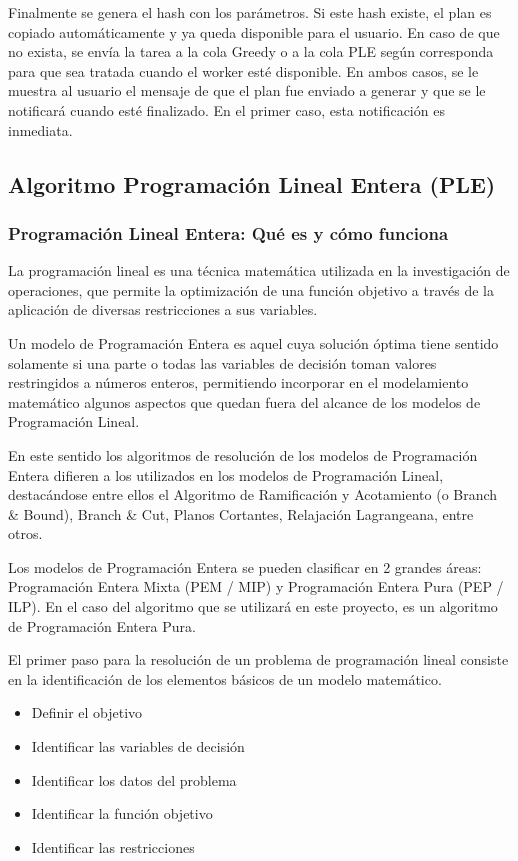 \documentclass[a4paper]{article}
\begin{document}
Finalmente se genera el hash con los parámetros. Si este hash existe, el plan es copiado automáticamente y ya queda disponible para el usuario. En caso de que no exista, se envía la tarea a la cola Greedy o a la cola PLE según corresponda para que sea tratada cuando el worker esté disponible. En ambos casos, se le muestra al usuario el mensaje de que el plan fue enviado a generar y que se le notificará cuando esté finalizado. En el primer caso, esta notificación es inmediata.


\subsection{Algoritmo Programación Lineal Entera (PLE)}

\subsubsection{Programación Lineal Entera: Qué es y cómo funciona}

La programación lineal es una técnica matemática utilizada en la investigación de operaciones, que permite la optimización de una función objetivo a través de la aplicación de diversas restricciones a sus variables.

Un modelo de Programación Entera es aquel cuya solución óptima tiene sentido solamente si una parte o todas las variables de decisión toman valores restringidos a números enteros, permitiendo incorporar en el modelamiento matemático algunos aspectos que quedan fuera del alcance de los modelos de Programación Lineal.

En este sentido los algoritmos de resolución de los modelos de Programación Entera difieren a los utilizados en los modelos de Programación Lineal, destacándose entre ellos el Algoritmo de Ramificación y Acotamiento (o Branch \& Bound), Branch \& Cut, Planos Cortantes, Relajación Lagrangeana, entre otros.

Los modelos de Programación Entera se pueden clasificar en 2 grandes áreas: Programación Entera Mixta (PEM / MIP) y Programación Entera Pura (PEP / ILP). En el caso del algoritmo que se utilizará en este proyecto, es un algoritmo de Programación Entera Pura.\newline

El primer paso para la resolución de un problema de programación lineal consiste en la identificación de los elementos básicos de un modelo matemático.

\begin{itemize}
	\item Definir el objetivo
	\item Identificar las variables de decisión
	\item Identificar los datos del problema
	\item Identificar la función objetivo
	\item Identificar las restricciones
\end{itemize}
\end{document}

